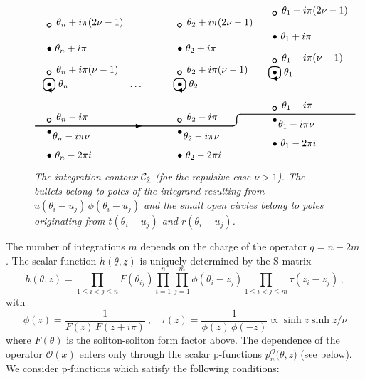 \documentclass[a4paper,12pt]{article}
\begin{document}
\begin{figure}[tbh]
\[
\unitlength4.2mm%
\begin{picture}(27,13)
\thicklines
\put(1,0){
\put(0,0){$\bullet~\theta_n-2\pi i$}
\put(0,2){$\bullet$}\put(.5,1.6){$\theta_n-i\pi\nu$}
\put(.19,3.2){\circle{.3}~$\theta_n-i\pi$}
\put(0,6){$\bullet~~\theta_n$}
\put(.2,6.2){\oval(1,1)}\put(-.1,5.71){\vector(-1,0){0}}
\put(.19,7.2){\circle{.3}~$\theta_n+i\pi(\nu-1)$}
\put(0,9){$\bullet~\theta_n+i\pi$}
\put(.19,11.2){\circle{.3}~$\theta_n+i\pi(2\nu-1)$}
}
\put(8,6){\dots}
\put(12,0){
\put(0,0){$\bullet~\theta_2-2\pi i$}
\put(0,2){$\bullet$}\put(.5,1.6){$\theta_2-i\pi\nu$}
\put(.19,3.2){\circle{.3}~$\theta_2-i\pi$}
\put(0,6){$\bullet~~\theta_2$}
\put(.2,6.2){\oval(1,1)}\put(-.1,5.71){\vector(-1,0){0}}
\put(.19,7.2){\circle{.3}~$\theta_2+i\pi(\nu-1)$}
\put(0,9){$\bullet~\theta_2+i\pi$}
\put(.19,11.2){\circle{.3}~$\theta_2+i\pi(2\nu-1)$}
}
\put(20,1){
\put(0,0){$\bullet~\theta_1-2\pi i$}
\put(0,2){$\bullet$}\put(.5,1.6){$\theta_1-i\pi\nu$}
\put(.19,3.2){\circle{.3}~$\theta_1-i\pi$}
\put(0,6){$\bullet~~\theta_1$}
\put(.2,6.2){\oval(1,1)}\put(-.1,5.71){\vector(-1,0){0}}
\put(.19,7.2){\circle{.3}~$\theta_1+i\pi(\nu-1)$}
\put(0,9){$\bullet~\theta_1+i\pi$}
\put(.19,11.2){\circle{.3}~$\theta_1+i\pi(2\nu-1)$}
}
\put(9,2.7){\vector(1,0){0}}
\put(0,3.2){\oval(34,1)[br]}
\put(27,3.2){\oval(20,1)[tl]}
\end{picture}
\]
\caption{\textit{The integration contour $\mathcal{C_{\protect\underline{%
\theta }}}$ (for the repulsive case $\nu >1$). The bullets belong to poles
of the integrand resulting from $u(\theta _{i}-u_{j})\,\phi (\theta
_{i}-u_{j})$ and the small open circles belong to poles originating from $%
t(\theta _{i}-u_{j})$ and $r(\theta _{i}-u_{j})$. }}
\label{f}
\end{figure}
The number of integrations $m$ depends on the charge of the operator $q=n-2m$%
. The scalar function $h(\underline{\theta },{\underline{z}})$ is uniquely
determined by the S-matrix 
\[
h(\underline{\theta },{\underline{z}})=\prod_{1\le i<j\le n}F(\theta
_{ij})\prod_{i=1}^{n}\prod_{j=1}^{m}\phi (\theta _{i}-z_{j})\prod_{1\le
i<j\le m}\tau (z_{i}-z_{j})\,, 
\]
with 
\[
\phi (z)=\frac{1}{F(z)\,F(z+i\pi )}~,~~~~\tau (z)=\frac{1}{\phi (z)\,\phi
(-z)}\varpropto \sinh z\sinh z/\nu 
\]
where $F(\theta )$ is the soliton-soliton form factor above. The dependence
of the operator $\mathcal{O}(x)$ enters only through the scalar p-functions $%
p_{n}^{\mathcal{O}}(\underline{\theta },{\underline{z})}$ (see below). We
consider p-functions which satisfy the following conditions:
\end{document}
